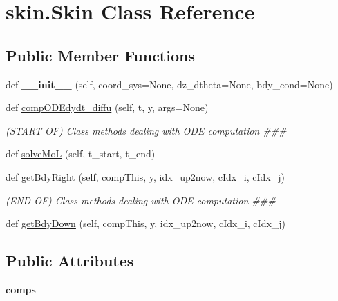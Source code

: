 \hypertarget{classskin_1_1Skin}{}\section{skin.\+Skin Class Reference}
\label{classskin_1_1Skin}
\subsection*{Public Member Functions}
\begin{DoxyCompactItemize}
\item 
def {\bfseries \+\_\+\+\_\+init\+\_\+\+\_\+} (self, coord\+\_\+sys=None, dz\+\_\+dtheta=None, bdy\+\_\+cond=None)\hypertarget{classskin_1_1Skin_ae8c14fb876f2b90c955f4914df5ecde4}{}\label{classskin_1_1Skin_ae8c14fb876f2b90c955f4914df5ecde4}

\item 
def \hyperlink{classskin_1_1Skin_ae9dae685416ddd7e3f345a3ff6449998}{comp\+O\+D\+Edydt\+\_\+diffu} (self, t, y, args=None)
\begin{DoxyCompactList}\small\item\em (S\+T\+A\+RT OF) Class methods dealing with O\+DE computation \#\#\# \end{DoxyCompactList}\item 
def \hyperlink{classskin_1_1Skin_aefaa68f4f0d659f05aa2babeafbe1995}{solve\+MoL} (self, t\+\_\+start, t\+\_\+end)
\item 
def \hyperlink{classskin_1_1Skin_a411a39ab1c8faf9faa3fb6c8bea777f9}{get\+Bdy\+Right} (self, comp\+This, y, idx\+\_\+up2now, c\+Idx\+\_\+i, c\+Idx\+\_\+j)
\begin{DoxyCompactList}\small\item\em (E\+ND OF) Class methods dealing with O\+DE computation \#\#\# \end{DoxyCompactList}\item 
def \hyperlink{classskin_1_1Skin_a477a800e6beba99197c2744ebcdc5426}{get\+Bdy\+Down} (self, comp\+This, y, idx\+\_\+up2now, c\+Idx\+\_\+i, c\+Idx\+\_\+j)
\end{DoxyCompactItemize}
\subsection*{Public Attributes}
\begin{DoxyCompactItemize}
\item 
{\bfseries comps}\hypertarget{classskin_1_1Skin_ac0a2c5b23d7f0f6e69edb6f666c6a8fc}{}\label{classskin_1_1Skin_ac0a2c5b23d7f0f6e69edb6f666c6a8fc}

\end{DoxyCompactItemize}


